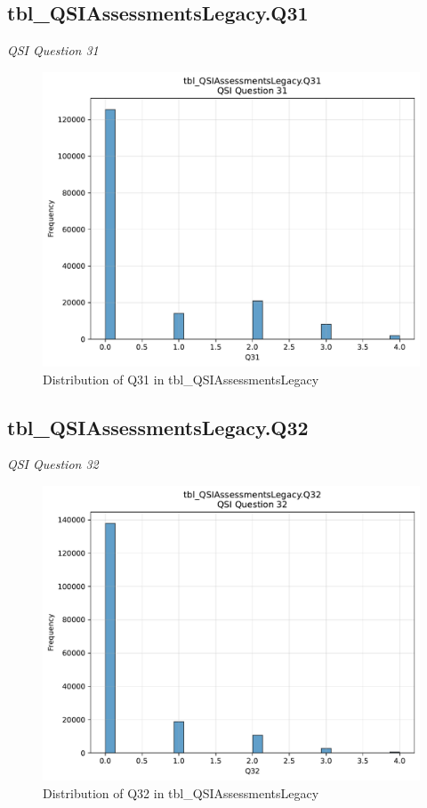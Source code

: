 \subsection{tbl\_QSIAssessmentsLegacy.Q31}
\textit{QSI Question 31}

\begin{figure}[htbp]
\centering
\includegraphics[width=\textwidth]{figures/dbo_tbl_QSIAssessmentsLegacy_Q31.pdf}
\caption{Distribution of Q31 in tbl\_QSIAssessmentsLegacy}
\end{figure}\newpage

\subsection{tbl\_QSIAssessmentsLegacy.Q32}
\textit{QSI Question 32}

\begin{figure}[htbp]
\centering
\includegraphics[width=\textwidth]{figures/dbo_tbl_QSIAssessmentsLegacy_Q32.pdf}
\caption{Distribution of Q32 in tbl\_QSIAssessmentsLegacy}
\end{figure}\newpage

